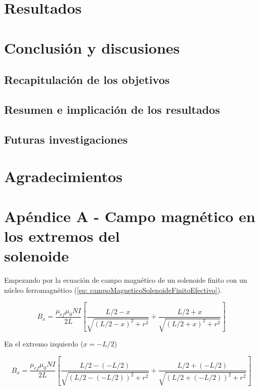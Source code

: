 \documentclass[a4paper,12pt]{article}
\begin{document}
\section*{Resultados}

    

\section*{Conclusión y discusiones}

    \subsection*{Recapitulación de los objetivos}



    \subsection*{Resumen e implicación de los resultados}



    \subsection*{Futuras investigaciones}

        

\section*{Agradecimientos}

    

\section*{Apéndice A - Campo magnético en los extremos del \\solenoide}

Empezando por la ecuación de campo magnético de un solenoide finito con un núcleo ferromagnético (\ref{eq: campoMagneticoSolenoideFinitoEfectivo}).

    \begin{equation*}
        B_x = \frac{\mu_{ef}\mu_0 N I}{2L} \left[ \frac{L/2 - x}{\sqrt{(L/2 - x)^2 + r^2}} + \frac{L/2 + x}{\sqrt{(L/2 + x)^2 + r^2}} \right]
    \end{equation*}

    En el extremo izquierdo ($x=-L/2$)

    \begin{equation*}
        B_x = \frac{\mu_{ef}\mu_0 N I}{2L} \left[ \frac{L/2 - (-L/2)}{\sqrt{(L/2 - (-L/2))^2 + r^2}} + \frac{L/2 + (-L/2)}{\sqrt{(L/2 + (-L/2))^2 + r^2}} \right]
    \end{equation*}
\end{document}
